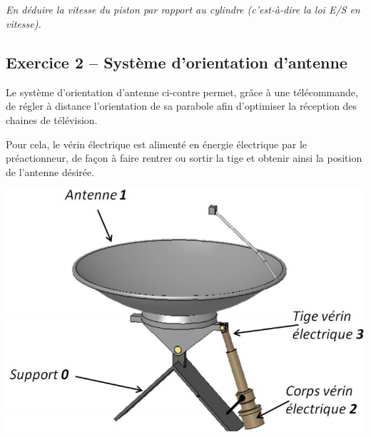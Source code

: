 \documentclass[11pt,oneside]{article}
\begin{document}


\subparagraph{}
\textit{En déduire la vitesse du piston par rapport au cylindre (c'est-à-dire la loi E/S en vitesse). }



\subsection*{Exercice 2 -- Système d'orientation d'antenne}
\setcounter{subparagraph}{0}

\begin{minipage}[c]{.65\linewidth}
Le système d’orientation d’antenne ci-contre permet, grâce à une télécommande, de régler à distance l’orientation de sa parabole afin d’optimiser la réception des chaines de télévision. 
 
Pour cela, le vérin électrique est alimenté en énergie électrique par le préactionneur, de façon à faire rentrer ou sortir la tige et obtenir ainsi la position de l’antenne désirée. 
\end{minipage} \hfill
\begin{minipage}[c]{.3\linewidth}
\begin{center}
\includegraphics[width=.95\textwidth]{png/fig3} 
\end{center}
\end{minipage} 
\end{document}
